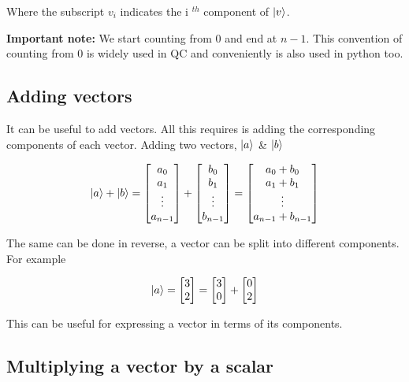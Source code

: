 Where the subscript $v_i$ indicates the i $^{th}$ component of $\ket{v}$. 

\textbf{Important note:} We start counting from 0 and end at $n-1$. This convention of counting from 0 is widely used in QC and conveniently is also used in python too. 

\subsection{ Adding vectors }

It can be useful to add vectors. All this requires is adding the corresponding components of each vector. Adding two vectors, $\ket{a}$ \& $\ket{b}$

$$\ket{a} + \ket{b} = \begin{bmatrix} a_0 \\ a_1 \\ \vdots \\ a_{n-1} \end{bmatrix} + \begin{bmatrix} b_0 \\ b_1 \\ \vdots \\ b_{n-1} \end{bmatrix} = \begin{bmatrix} a_0 + b_0 \\ a_1 + b_1 \\ \vdots \\ a_{n-1} + b_{n-1} \end{bmatrix} $$

The same can be done in reverse, a vector can be split into different components. For example 

$$
\ket{a} = \begin{bmatrix} 3 \\ 2 \end{bmatrix} = \begin{bmatrix} 3 \\ 0 \end{bmatrix} + \begin{bmatrix} 0 \\ 2 \end{bmatrix}
$$

This can be useful for expressing a vector in terms of its components. 

\subsection{ Multiplying a vector by a scalar }

